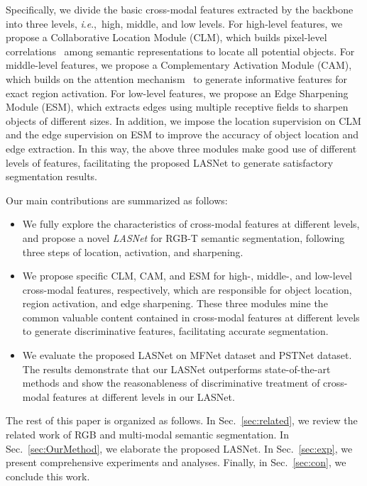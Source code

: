 \documentclass[journal]{IEEEtran}
\newcommand{\ie}{\textit{i}.\textit{e}.,~}
\begin{document}
Specifically, we divide the basic cross-modal features extracted by the backbone into three levels, \ie high, middle, and low levels.
For high-level features, we propose a Collaborative Location Module (CLM), which builds pixel-level correlations~\cite{2022COSNet,2022CorrNet} among semantic representations to locate all potential objects.
For middle-level features, we propose a Complementary Activation Module (CAM), which builds on the attention mechanism~\cite{2018CBAM,2019DANet} to generate informative features for exact region activation.
For low-level features, we propose an Edge Sharpening Module (ESM), which extracts edges using multiple receptive fields to sharpen objects of different sizes.
In addition, we impose the location supervision on CLM and the edge supervision on ESM to improve the accuracy of object location and edge extraction.
In this way, the above three modules make good use of different levels of features, facilitating the proposed LASNet to generate satisfactory segmentation results. 


Our main contributions are summarized as follows:
\begin{itemize}
\item We fully explore the characteristics of cross-modal features at different levels, and propose a novel \emph{LASNet} for RGB-T semantic segmentation, following three steps of location, activation, and sharpening.


\item We propose specific CLM, CAM, and ESM for high-, middle-, and low-level cross-modal features, respectively, which are responsible for object location, region activation, and edge sharpening.
These three modules mine the common valuable content contained in cross-modal features at different levels to generate discriminative features, facilitating accurate segmentation.


\item We evaluate the proposed LASNet on MFNet dataset and PSTNet dataset.
The results demonstrate that our LASNet outperforms state-of-the-art methods and show the reasonableness of discriminative treatment of cross-modal features at different levels in our LASNet.

\end{itemize}


The rest of this paper is organized as follows.
In Sec.~\ref{sec:related}, we review the related work of RGB and multi-modal semantic segmentation.
In Sec.~\ref{sec:OurMethod}, we elaborate the proposed LASNet.
In Sec.~\ref{sec:exp}, we present comprehensive experiments and analyses.
Finally, in Sec.~\ref{sec:con}, we conclude this work.
\end{document}
